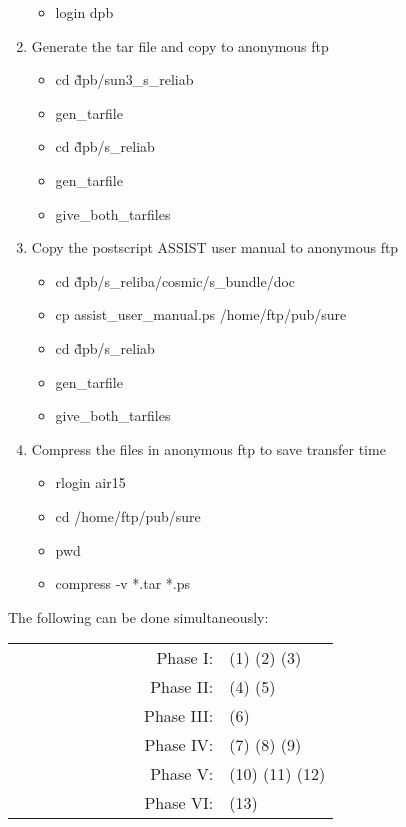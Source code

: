 \begin{enumerate}
\begin{itemize}
      \item login dpb
      \end{itemize}
   \item Generate the tar file and copy to anonymous ftp
      \begin{itemize}
      \item cd \~dpb/sun3\_s\_reliab
      \item gen\_tarfile
      \item cd \~dpb/s\_reliab
      \item gen\_tarfile
      \item give\_both\_tarfiles
      \end{itemize}
   \item Copy the postscript ASSIST user manual to anonymous ftp
      \begin{itemize}
      \item cd \~dpb/s\_reliba/cosmic/s\_bundle/doc
      \item cp assist\_user\_manual.ps /home/ftp/pub/sure
      \item cd \~dpb/s\_reliab
      \item gen\_tarfile
      \item give\_both\_tarfiles
      \end{itemize}
   \item Compress the files in anonymous ftp to save transfer time
      \begin{itemize}
      \item rlogin air15
      \item cd /home/ftp/pub/sure
      \item pwd
      \item compress -v *.tar *.ps
      \end{itemize}
\end{enumerate}


The following can be done simultaneously:

\begin{tabular}{rl}
~~~~~~~~~~~~~~~~Phase I: & (1) (2) (3) \\
~~~~~~~~~~~~~~~~Phase II: & (4) (5) \\
~~~~~~~~~~~~~~~~Phase III: & (6) \\
~~~~~~~~~~~~~~~~Phase IV: & (7) (8) (9) \\
~~~~~~~~~~~~~~~~Phase V: & (10) (11) (12) \\
~~~~~~~~~~~~~~~~Phase VI: & (13) \\
\end{tabular}


